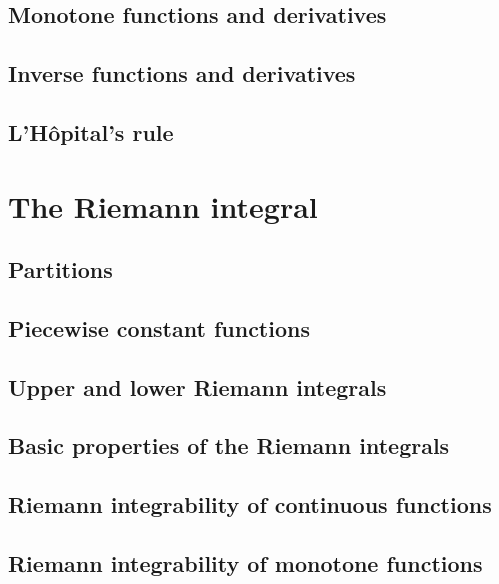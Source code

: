 \documentclass[
]{book}
\theoremstyle{definition}
\theoremstyle{definition}
\theoremstyle{definition}
\theoremstyle{definition}
\theoremstyle{remark}
\begin{document}
\section{Monotone functions and derivatives}\label{monotone-functions-and-derivatives}

\section{Inverse functions and derivatives}\label{inverse-functions-and-derivatives}

\section{L'Hôpital's rule}\label{lhuxf4pitals-rule}

\chapter{The Riemann integral}\label{riemann}

\section{Partitions}\label{partitions}

\section{Piecewise constant functions}\label{piecewise-constant-functions}

\section{Upper and lower Riemann integrals}\label{upper-and-lower-riemann-integrals}

\section{Basic properties of the Riemann integrals}\label{basic-properties-of-the-riemann-integrals}

\section{Riemann integrability of continuous functions}\label{riemann-integrability-of-continuous-functions}

\section{Riemann integrability of monotone functions}\label{riemann-integrability-of-monotone-functions}
\end{document}
